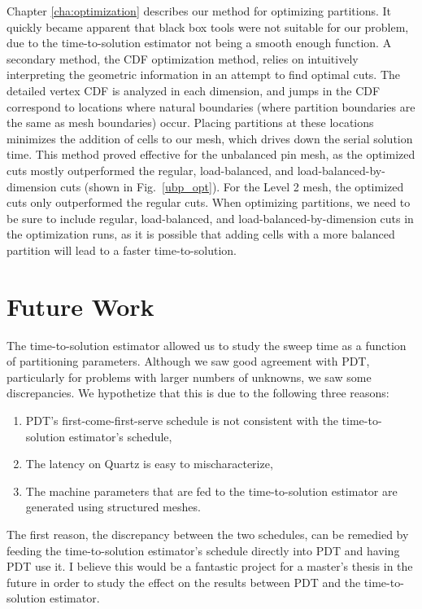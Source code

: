 Chapter \ref{cha:optimization} describes our method for optimizing partitions.
It quickly became apparent that black box tools were not suitable for our problem, due to the time-to-solution estimator not being a smooth enough function.
A secondary method, the CDF optimization method, relies on intuitively interpreting the geometric information in an attempt to find optimal cuts.
The detailed vertex CDF is analyzed in each dimension, and jumps in the CDF correspond to locations where natural boundaries (where partition boundaries are the same as mesh boundaries) occur.
Placing partitions at these locations minimizes the addition of cells to our mesh, which drives down the serial solution time.
This method proved effective for the unbalanced pin mesh, as the optimized cuts mostly outperformed the regular, load-balanced, and load-balanced-by-dimension cuts (shown in Fig.~\ref{ubp_opt}).
For the Level 2 mesh, the optimized cuts only outperformed the regular cuts.
When optimizing partitions, we need to be sure to include regular, load-balanced, and load-balanced-by-dimension cuts in the optimization runs, as it is possible that adding cells with a more balanced partition will lead to a faster time-to-solution.

\section{Future Work}

The time-to-solution estimator allowed us to study the sweep time as a function of partitioning parameters.
Although we saw good agreement with PDT, particularly for problems with larger numbers of unknowns, we saw some discrepancies.
We hypothetize that this is due to the following three reasons:
\begin{enumerate}
\item PDT's first-come-first-serve schedule is not consistent with the time-to-solution estimator's schedule,
\item The latency on Quartz is easy to mischaracterize,
\item The machine parameters that are fed to the time-to-solution estimator are generated using structured meshes.
\end{enumerate}

The first reason, the discrepancy between the two schedules, can be remedied by feeding the time-to-solution estimator's schedule directly into PDT and having PDT use it.
I believe this would be a fantastic project for a master's thesis in the future in order to study the effect on the results between PDT and the time-to-solution estimator.

